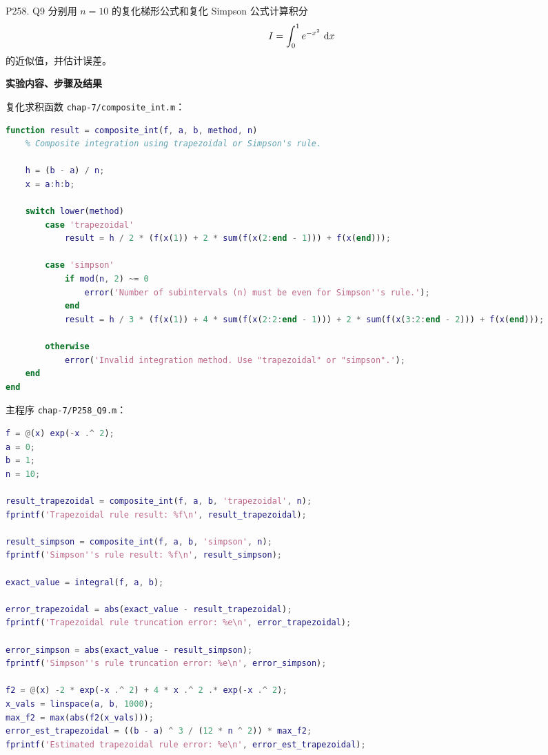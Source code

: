 \documentclass[11pt, a4paper]{ctexart}
\begin{document}
\begin{problem}{P258. Q9}
    分别用 $n=10$ 的复化梯形公式和复化 Simpson 公式计算积分
    \[
        I=\int_0^1 e^{-x^2}\,\,\mathrm{d} x
    \]
    的近似值，并估计误差。
\end{problem}

\begin{solution}
    \textbf{实验内容、步骤及结果}

    复化求积函数 \texttt{chap-7/composite\_int.m}：

\begin{lstlisting}[language=Matlab]
function result = composite_int(f, a, b, method, n)
    % Composite integration using trapezoidal or Simpson's rule.

    h = (b - a) / n;
    x = a:h:b;

    switch lower(method)
        case 'trapezoidal'
            result = h / 2 * (f(x(1)) + 2 * sum(f(x(2:end - 1))) + f(x(end)));

        case 'simpson'
            if mod(n, 2) ~= 0
                error('Number of subintervals (n) must be even for Simpson''s rule.');
            end
            result = h / 3 * (f(x(1)) + 4 * sum(f(x(2:2:end - 1))) + 2 * sum(f(x(3:2:end - 2))) + f(x(end)));

        otherwise
            error('Invalid integration method. Use "trapezoidal" or "simpson".');
    end
end
\end{lstlisting}

    主程序 \texttt{chap-7/P258\_Q9.m}：

\begin{lstlisting}[language=Matlab]
f = @(x) exp(-x .^ 2);
a = 0;
b = 1;
n = 10;

result_trapezoidal = composite_int(f, a, b, 'trapezoidal', n);
fprintf('Trapezoidal rule result: %f\n', result_trapezoidal);

result_simpson = composite_int(f, a, b, 'simpson', n);
fprintf('Simpson''s rule result: %f\n', result_simpson);

exact_value = integral(f, a, b);

error_trapezoidal = abs(exact_value - result_trapezoidal);
fprintf('Trapezoidal rule truncation error: %e\n', error_trapezoidal);

error_simpson = abs(exact_value - result_simpson);
fprintf('Simpson''s rule truncation error: %e\n', error_simpson);

f2 = @(x) -2 * exp(-x .^ 2) + 4 * x .^ 2 .* exp(-x .^ 2);
x_vals = linspace(a, b, 1000);
max_f2 = max(abs(f2(x_vals)));
error_est_trapezoidal = ((b - a) ^ 3 / (12 * n ^ 2)) * max_f2;
fprintf('Estimated trapezoidal rule error: %e\n', error_est_trapezoidal);


\end{lstlisting}
\end{solution}
\end{document}
